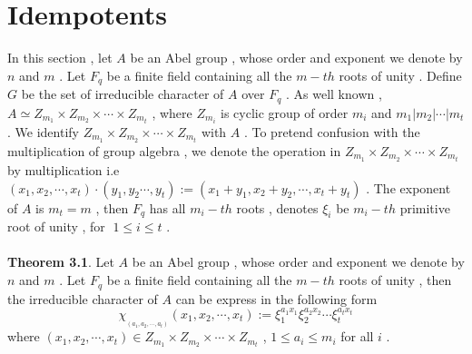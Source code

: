 \documentclass{article}
\begin{document}
\section{Idempotents}
In this section , let $A$ be an Abel group , whose order and exponent we denote by $n$ and $m$ . Let $F_q$ be a finite field containing all the $m-th$ roots of unity . Define $G$ be the set of irreducible character of $A$ over $F_q$ . As well known , $A\simeq Z_{m_1}\times Z_{m_2}\times\cdots\times Z_{m_t}$ , where $Z_{m_i}$ is cyclic group of order $m_i$ and $m_1|m_2|\cdots|m_t$ . We identify $Z_{m_1}\times Z_{m_2}\times\cdots\times Z_{m_t}$ with $A$ . To pretend confusion with the multiplication of group algebra , we denote the operation in $Z_{m_1}\times Z_{m_2}\times\cdots\times Z_{m_t}$ by multiplication i.e $(x_1,x_2,\cdots,x_t)\cdot(y_1,y_2\cdots,y_t):=(x_1+y_1,x_2+y_2,\cdots,x_t+y_t)$ . The exponent of $A$ is $m_t=m$ , then $F_q$ has all $m_{i}-th$ roots , denotes $\xi_i$ be $m_i-th$ primitive root of unity , for $\;1\leq i\leq t$ . \\
\quad\\
\textbf{Theorem 3.1}. Let $A$ be an Abel group , whose order and exponent we denote by $n$ and $m$ . Let $F_q$ be a finite field containing all the $m-th$ roots of unity , then the irreducible character of $A$ can be express in the following form 
\begin{equation}
    \chi_{_{(a_1,a_2,\cdots,a_t)}}(x_1,x_2,\cdots,x_t):=\xi_1^{a_1x_1}\xi_2^{a_2x_2}\cdots\xi_t^{a_tx_t}
\end{equation}
where $(x_1,x_2,\cdots,x_t)\in{Z_{m_1}\times Z_{m_2}\times\cdots\times Z_{m_t}}$ , $1\leq a_i\leq m_i$ for all $i$ . 
\end{document}
